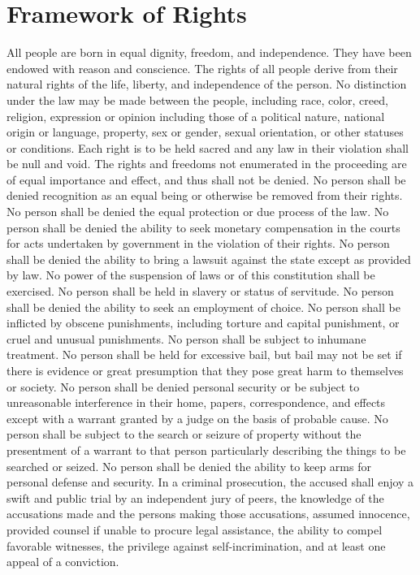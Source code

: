 \documentclass{article}
\begin{document}
\section{Framework of Rights}
All people are born in equal dignity, freedom, and independence. They have been endowed with reason and conscience. The rights of all people derive from their natural rights of the life, liberty, and independence of the person. 
No distinction under the law may be made between the people, including race, color, creed, religion, expression or opinion including those of a political nature, national origin or language, property, sex or gender, sexual orientation, or other statuses or conditions.
Each right is to be held sacred and any law in their violation shall be null and void. The rights and freedoms not enumerated in the proceeding are of equal importance and effect, and thus shall not be denied.
No person shall be denied recognition as an equal being or otherwise be removed from their rights. No person shall be denied the equal protection or due process of the law.
No person shall be denied the ability to seek monetary compensation in the courts for acts undertaken by government in the violation of their rights. No person shall be denied the ability to bring a lawsuit against the state except as provided by law.
No power of the suspension of laws or of this constitution shall be exercised.
No person shall be held in slavery or status of servitude. No person shall be denied the ability to seek an employment of choice.
No person shall be inflicted by obscene punishments, including torture and capital punishment, or cruel and unusual punishments. No person shall be subject to inhumane treatment.
No person shall be held for excessive bail, but bail may not be set if there is evidence or great presumption that they pose great harm to themselves or society.
No person shall be denied personal security or be subject to unreasonable interference in their home, papers, correspondence, and effects except with a warrant granted by a judge on the basis of probable cause.
No person shall be subject to the search or seizure of property without the presentment of a warrant to that person particularly describing the things to be searched or seized.
No person shall be denied the ability to keep arms for personal defense and security.
In a criminal prosecution, the accused shall enjoy a swift and public trial by an independent jury of peers, the knowledge of the accusations made and the persons making those accusations, assumed innocence, provided counsel if unable to procure legal assistance, the ability to compel favorable witnesses, the privilege against self-incrimination, and at least one appeal of a conviction.
\end{document}
